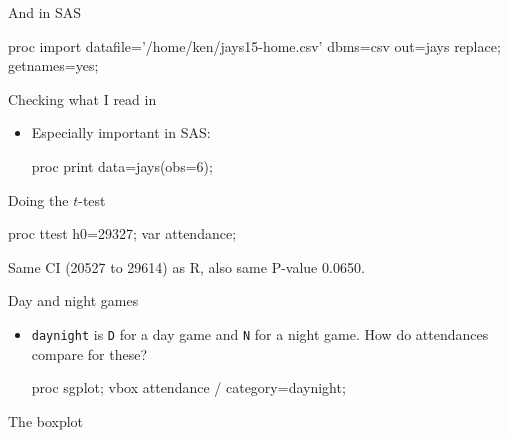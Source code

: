 \documentclass[unknownkeysallowed]{beamer}\usepackage[]{graphicx}\usepackage[]{color}
\begin{document}
\begin{frame}[fragile]{And in SAS}
  
  \begin{Datastep}
proc import
  datafile='/home/ken/jays15-home.csv'
    dbms=csv
    out=jays
    replace;
  getnames=yes;
  \end{Datastep}
  
\end{frame}

\begin{frame}[fragile]{Checking what I read in}
  
  \begin{itemize}
  \item Especially important in SAS:
    
    \begin{Sascode}[store=iza]
proc print data=jays(obs=6);      
    \end{Sascode}
    
  \end{itemize}
  
\end{frame}

\begin{frame}[fragile]{Doing the $t$-test}
  \begin{Sascode}[store=ia]
proc ttest h0=29327;
  var attendance;
  \end{Sascode}

  
  Same CI (20527 to 29614) as R, also same P-value 0.0650.

\end{frame}



\begin{frame}[fragile]{Day and night games}
  
  \begin{itemize}
  \item \texttt{daynight} is \texttt{D} for a day game and \texttt{N} for
    a night game. How do attendances compare for these?
\begin{Sascode}[store=id]
  proc sgplot;
    vbox attendance / category=daynight;
\end{Sascode}
  \end{itemize}
  
\end{frame}

\begin{frame}[fragile]{The boxplot}
  
  
\end{frame}
\end{document}

